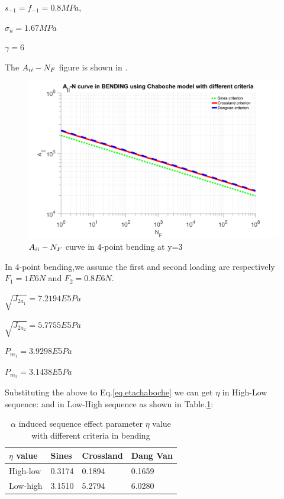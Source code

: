 $s_{-1}=f_{-1}=0.8MPa$,

$\sigma_{u}=1.67MPa$ 

$\gamma=6$

The $A_{\uppercase\expandafter{\romannumeral2}}-N_F$ figure is shown in .
\begin{figure}[h!]
	\centering
	\includegraphics[width=\textwidth]{figures//JNbending.png} 
	\caption{$A_{\uppercase\expandafter{\romannumeral2}}-N_F$ curve in 4-point bending at y=3}
	\label{JNbending}
\end{figure}

In 4-point bending,we assume the first and second loading are respectively $F_1=1E6 N$ and $F_2=0.8E6 N$. 

\vspace{6pt}
$\sqrt{J_{2a_1}}=7.2194E5 Pa$

\vspace{6pt}
$\sqrt{J_{2a_2}}=5.7755E5 Pa$

\vspace{6pt}
$P_{m_1}=3.9298E5 Pa$

\vspace{6pt}
$P_{m_2}=3.1438E5 Pa$

Substituting the above to Eq.\eqref{eq.etachaboche} we can get $\eta$ in High-Low sequence:
and in Low-High sequence as shown in Table.\ref{tab.etabending}:
\begin{table}[!h]
	\centering
	\begin{tabular}{llll}
		\hline
		$\eta$ value   & Sines  & Crossland & Dang Van \\ \hline
		High-low & 0.3174 & 0.1894    &  0.1659   \\
		Low-high & 3.1510 & 5.2794   & 6.0280  \\ \hline
	\end{tabular}
	\caption{$\alpha$ induced sequence effect parameter $\eta$ value with different criteria in bending}
	\label{tab.etabending}
\end{table}

